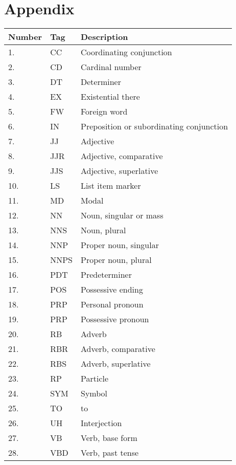 \chapter{Appendix}

\begin{table}[h]
	\centering
    \begin{tabular}{| l | l | l |}
    \hline
    Number & Tag & Description \\ \hline
	\hline
1. & 	CC &	Coordinating conjunction \\ \hline
2. & 	CD &	Cardinal number \\ \hline
3. & 	DT  & Determiner \\ \hline
4. & 	EX  &	Existential there \\ \hline
5. & 	FW &	Foreign word \\ \hline
6. & 	IN  &	Preposition or subordinating conjunction \\ \hline
7. & 	JJ &	Adjective \\ \hline
8. & 	JJR &	Adjective, comparative \\ \hline
9. & 	JJS &	Adjective, superlative \\ \hline
10. & 	LS &	List item marker \\ \hline
11. & 	MD &	Modal \\ \hline
12. & 	NN &	Noun, singular or mass \\ \hline
13. & 	NNS &	Noun, plural \\ \hline
14. & 	NNP& 	Proper noun, singular \\ \hline
15. & 	NNPS &	Proper noun, plural \\ \hline
16. & 	PDT &	Predeterminer \\ \hline
17. & 	POS &	Possessive ending \\ \hline
18. & 	PRP &	Personal pronoun \\ \hline
19. & 	PRP&	Possessive pronoun \\ \hline
20. & 	RB &	Adverb \\ \hline
21. & 	RBR &	Adverb, comparative \\ \hline
22. & 	RBS &	Adverb, superlative \\ \hline
23. & 	RP &	Particle \\ \hline
24. & 	SYM &	Symbol \\ \hline
25. & 	TO &	to \\ \hline
26. & 	UH &	Interjection \\ \hline
27. & 	VB &	Verb, base form \\ \hline
28. & 	VBD &	Verb, past tense \\ \hline

\end{tabular}
\end{table}
